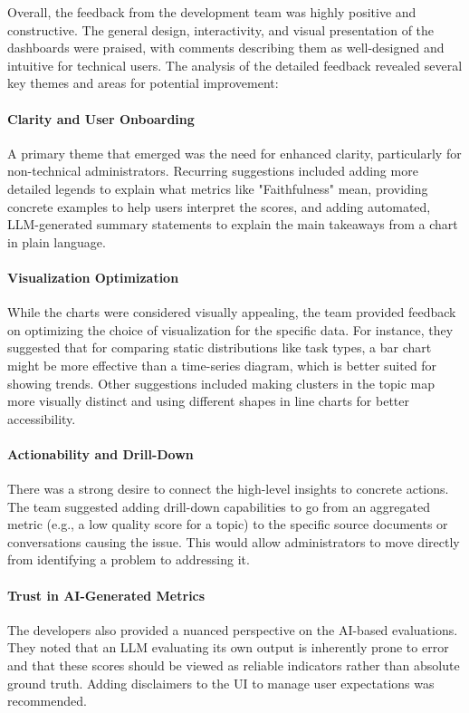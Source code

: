 \documentclass[
	english,
	ruledheaders=section,%
	class=report,%
	thesis={type=bachelor},%
	accentcolor=1b,%
	custommargins=true,%
	marginpar=false,%
	parskip=half-,%
	fontsize=11pt,%
	DIV=14,
]{tudapub}
\begin{document}
Overall, the feedback from the development team was highly positive and constructive. The general design, interactivity, and visual presentation of the dashboards were praised, with comments describing them as well-designed and intuitive for technical users. The analysis of the detailed feedback revealed several key themes and areas for potential improvement:

\paragraph{Clarity and User Onboarding} A primary theme that emerged was the need for enhanced clarity, particularly for non-technical administrators. Recurring suggestions included adding more detailed legends to explain what metrics like "Faithfulness" mean, providing concrete examples to help users interpret the scores, and adding automated, LLM-generated summary statements to explain the main takeaways from a chart in plain language.

\paragraph{Visualization Optimization} While the charts were considered visually appealing, the team provided feedback on optimizing the choice of visualization for the specific data. For instance, they suggested that for comparing static distributions like task types, a bar chart might be more effective than a time-series diagram, which is better suited for showing trends. Other suggestions included making clusters in the topic map more visually distinct and using different shapes in line charts for better accessibility.

\paragraph{Actionability and Drill-Down} There was a strong desire to connect the high-level insights to concrete actions. The team suggested adding drill-down capabilities to go from an aggregated metric (e.g., a low quality score for a topic) to the specific source documents or conversations causing the issue. This would allow administrators to move directly from identifying a problem to addressing it.

\paragraph{Trust in AI-Generated Metrics} The developers also provided a nuanced perspective on the AI-based evaluations. They noted that an LLM evaluating its own output is inherently prone to error and that these scores should be viewed as reliable indicators rather than absolute ground truth. Adding disclaimers to the UI to manage user expectations was recommended.
\end{document}
